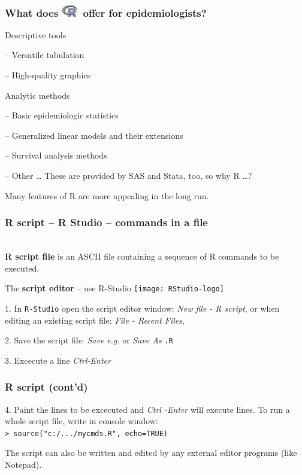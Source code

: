 \documentclass[handout,12pt]{beamer}
\newcommand{\Rlogo}[1]{\includegraphics[#1]{Rlogo}}
\newcommand{\RSlogo}[1]{\texttt{[image: RStudio-logo]}}
\begin{document}
\begin{frame}
\frametitle{What does \Rlogo{height=1.2em}\ offer for epidemiologists?}

\pause
\bi
\item Descriptive tools
\bi 
\item[--] Versatile tabulation
\item[--] High-quality graphics
\ei
\pause
\item Analytic methods
\bi
\item[--] Basic epidemiologic statistics
\item[--] Generalized linear models and their extensions
\item[--] Survival analysis methods
\item[--] Other \dots
\ei
\ei
\pause
These are provided by SAS and Stata, too, so why R \dots? 

\pause\medskip
Many features of R
are more appealing in the long run.
\end{frame}  

\begin{frame}[fragile]
\frametitle{R script -- R Studio -- commands in a file}

\ \\
\textbf{R script file} is an ASCII file
containing a sequence of R commands to be executed.

\bigskip
The {\bf script editor} -- use R-Studio \RSlogo{height=2.2em}
\bi
\item[1.] In {\tt R-Studio} open the script editor window: {\it New file - R script}, or when editing an existing {script file}:
 {\it File - Recent Files}, 
\pause\medskip
\pause\medskip    
\item[2.]    Save the {script file}: 
    {\it Save} \emph{e.g.} or     {\it Save As } {\tt *.R}
\item[3.]  Excecute a line {\it Ctrl-Enter}
    
\ei
\end{frame}

\begin{frame}[fragile]
\frametitle{R script (cont'd)}
\bi
 \item[4.] Paint the lines to be excecuted and {\it Ctrl -Enter} will execute lines.
 \pause\medskip  
\ei
 To run a whole script file, write in console window: \\
 {\tt > source("c:/.../mycmds.R", echo=TRUE)}

The script can also be written and edited by any external editor
programs (like Notepad). 

\end{frame}
\end{document}
